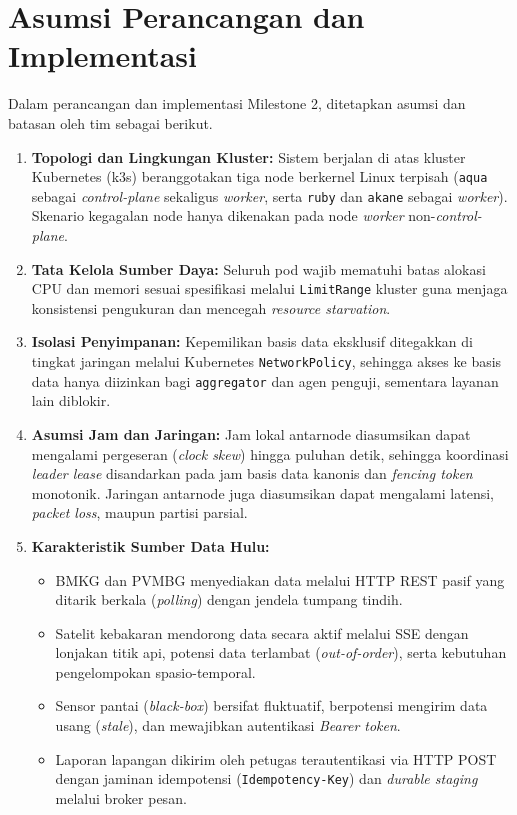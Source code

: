 \section{Asumsi Perancangan dan Implementasi}
Dalam perancangan dan implementasi Milestone 2, ditetapkan asumsi dan batasan oleh tim sebagai berikut.
\begin{enumerate}
    \item \textbf{Topologi dan Lingkungan Kluster:} Sistem berjalan di atas kluster Kubernetes (k3s) beranggotakan tiga node berkernel Linux terpisah (\texttt{aqua} sebagai \textit{control-plane} sekaligus \textit{worker}, serta \texttt{ruby} dan \texttt{akane} sebagai \textit{worker}). Skenario kegagalan node hanya dikenakan pada node \textit{worker} non-\textit{control-plane}.
    \item \textbf{Tata Kelola Sumber Daya:} Seluruh pod wajib mematuhi batas alokasi CPU dan memori sesuai spesifikasi melalui \texttt{LimitRange} kluster guna menjaga konsistensi pengukuran dan mencegah \textit{resource starvation}.
    \item \textbf{Isolasi Penyimpanan:} Kepemilikan basis data eksklusif ditegakkan di tingkat jaringan melalui Kubernetes \texttt{NetworkPolicy}, sehingga akses ke basis data hanya diizinkan bagi \texttt{aggregator} dan agen penguji, sementara layanan lain diblokir.
    \item \textbf{Asumsi Jam dan Jaringan:} Jam lokal antarnode diasumsikan dapat mengalami pergeseran (\textit{clock skew}) hingga puluhan detik, sehingga koordinasi \textit{leader lease} disandarkan pada jam basis data kanonis dan \textit{fencing token} monotonik. Jaringan antarnode juga diasumsikan dapat mengalami latensi, \textit{packet loss}, maupun partisi parsial.
    \item \textbf{Karakteristik Sumber Data Hulu:}
    \begin{itemize}
        \item BMKG dan PVMBG menyediakan data melalui HTTP REST pasif yang ditarik berkala (\textit{polling}) dengan jendela tumpang tindih.
        \item Satelit kebakaran mendorong data secara aktif melalui SSE dengan lonjakan titik api, potensi data terlambat (\textit{out-of-order}), serta kebutuhan pengelompokan spasio-temporal.
        \item Sensor pantai (\textit{black-box}) bersifat fluktuatif, berpotensi mengirim data usang (\textit{stale}), dan mewajibkan autentikasi \textit{Bearer token}.
        \item Laporan lapangan dikirim oleh petugas terautentikasi via HTTP POST dengan jaminan idempotensi (\texttt{Idempotency-Key}) dan \textit{durable staging} melalui broker pesan.
    \end{itemize}
\end{enumerate}

